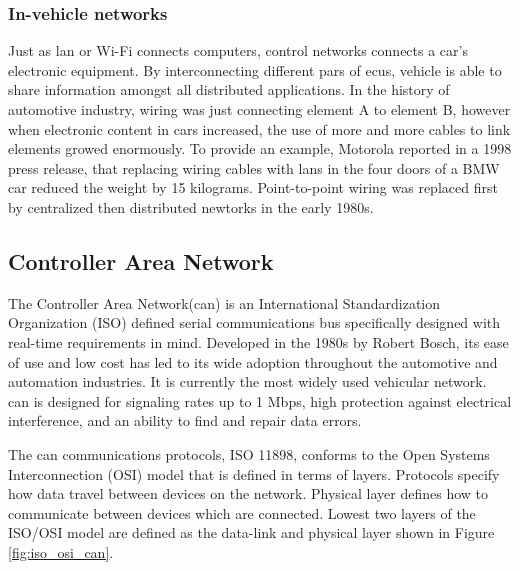 \subsubsection{In-vehicle networks} %
\label{ssub:in_vehicle_networks}
Just as \gls{lan} or Wi-Fi connects computers, control networks connects a car's electronic equipment. By interconnecting different pars of \glspl{ecu}, vehicle is able to share information amongst all distributed applications. In the history of automotive industry, wiring was just connecting element A to element B, however when electronic content in cars increased, the use of more and more cables to link elements growed enormously. To provide an example, Motorola reported in a 1998 press release, that replacing wiring cables with \gls{lan}s in the four doors of a BMW car reduced the weight by 15 kilograms.\cite{976923} Point-to-point wiring was replaced first by centralized then distributed newtorks in the early 1980s.\cite{815878}
\subsection{Controller Area Network} %
\label{sub:controller_area_network}
The Controller Area Network(\gls{can}) is an International Standardization Organization (ISO) defined serial communications bus  specifically designed with real-time requirements in mind. Developed in the 1980s by Robert Bosch, its ease of use and low cost has led to its wide adoption throughout the automotive and automation industries\cite{788104}. It is currently the most widely used vehicular network\cite{976923}. \gls{can} is designed for signaling rates up to 1 Mbps, high protection against electrical interference, and an ability to find and repair data errors.

The \gls{can} communications protocols,  ISO 11898, conforms to the Open Systems Interconnection (OSI) model that is defined in terms of layers\cite{5116731}. Protocols specify how data travel between devices on the network. Physical layer defines how to communicate between devices which are connected. Lowest two layers of the ISO/OSI model are defined as the data-link and physical layer shown in Figure \ref{fig:iso_osi_can}.

